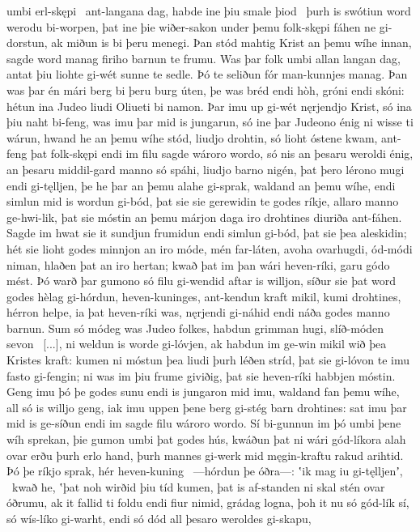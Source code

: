umbi erl-skępi \hld\ ant-langana dag,
habde ine þiu smale þiod \hld\ þurh is swótiun word
werodu bi-worpen, þat ine þie wiðer-sakon
under þemu folk-skępi fáhen ne gi-dorstun,
ak miðun is bi þeru menegi. Þan stód mahtig Krist
an þemu wíhe innan, sagde word manag
firiho barnun te frumu. Was þar folk umbi
allan langan dag, antat þiu liohte gi-wét
sunne te sedle. Þó te seliðun fór
man-kunnjes manag. Þan was þar én mári berg
bi þeru burg úten, þe was bréd endi hòh,
gróni endi skóni: hétun ina Judeo liudi
Oliueti bi namon. Þar imu up gi-wét
nęrjendjo Krist, só ina þiu naht bi-feng,
was imu þar mid is jungarun, só ine þar Judeono énig
ni wisse ti wárun, hwand he an þemu wíhe stód,
liudjo drohtin, só lioht óstene kwam,
ant-feng þat folk-skępi endi im filu sagde
wároro wordo, só nis an þesaru weroldi énig,
an þesaru middil-gard manno só spáhi,
liudjo barno nigén, þat þero lérono mugi
endi gi-tęlljen, þe he þar an þemu alahe gi-sprak,
waldand an þemu wíhe, endi simlun mid is wordun gi-bód,
þat sie sie gerewidin te godes ríkje,
allaro manno ge-hwi-lik, þat sie móstin an þemu márjon daga
iro drohtines diuriða ant-fáhen.
Sagde im hwat sie it sundjun frumidun endi simlun gi-bód,
þat sie þea aleskidin; hét sie lioht godes
minnjon an iro móde, mén far-láten,
avoha ovarhugdi, ód-módi niman,
hlaðen þat an iro hertan; kwað þat im þan wári heven-ríki,
garu gódo mést. Þó warð þar gumono só filu
gi-wendid aftar is willjon, síður sie þat word godes
hèlag gi-hórdun, heven-kuninges,
ant-kendun kraft mikil, kumi drohtines,
hérron helpe, ia þat heven-ríki was,
nęrjendi gi-náhid endi náða godes
manno barnun. Sum só módeg was
Judeo folkes, habdun grimman hugi,
slíð-móden sevon \hld\ [...],
ni weldun is worde gi-lóvjen, ak habdun im ge-win mikil
wið þea Kristes kraft: kumen ni móstun
þea liudi þurh léðen stríd, þat sie gi-lóvon te imu
fasto gi-fengin; ni was im þiu frume giviðig,
þat sie heven-ríki habbjen móstin.
Geng imu þó þe godes sunu endi is jungaron mid imu,
waldand fan þemu wíhe, all só is willjo geng,
iak imu uppen þene berg gi-stég barn drohtines:
sat imu þar mid is ge-síðun endi im sagde filu
wároro wordo. Sí bi-gunnun im þó umbi þene wíh sprekan,
þie gumon umbi þat godes hús, kwáðun þat ni wári gód-líkora
alah ovar erðu þurh erlo hand,
þurh mannes gi-werk mid męgin-kraftu
rakud arihtid. Þó þe ríkjo sprak,
hér heven-kuning \hld\ —hórdun þe óðra—:
ʽik mag iu gi-tęlljenʼ, \hld\ kwað he, ʽþat noh wirðid þiu tíd kumen,
þat is af-standen ni skal stén ovar óðrumu,
ak it fallid ti foldu endi fiur nimid,
grádag logna, þoh it nu só gód-lík sí,
só wís-líko gi-warht, endi só dód all þesaro weroldes gi-skapu,
